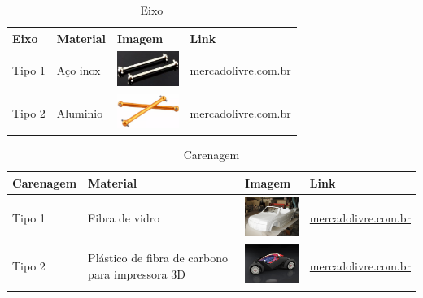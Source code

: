   \begin{table}[!htbp]
  \begin{center}
  \caption{Eixo}
  \begin{tabular}{|p{2cm}|p{3cm}|p{2cm}|p{4cm}|}
  \hline
  \textbf{Eixo} & \textbf{Material} & \textbf{Imagem} & \textbf{Link}\\\hline\hline
  Tipo 1 & Aço inox & \includegraphics[width=2cm]{figuras/eixo_inox.eps} & \href{http://produto.mercadolivre.com.br/MLB-681527051-par-de-eixo-dogbone-84-mm-06061-redcat-himoto-exceed-hsp-_JM}{mercadolivre.com.br}\\\hline
  Tipo 2 & Aluminio  & \includegraphics[width=2cm]{figuras/eixo_aluminio.eps} & \href{http://produto.mercadolivre.com.br/MLB-700430643-eixos-dogbones-em-aluminio-mastadon-spino-himoto-23608-par-_JM}{mercadolivre.com.br}\\\hline
  \end{tabular}
  \end{center}
  \end{table}

  \begin{table}[!htbp]
  \begin{center}
  \caption{Carenagem}
  \begin{tabular}{|p{3cm}|p{3cm}|p{2cm}|p{4cm}|}
  \hline
  \textbf{Carenagem} & \textbf{Material} & \textbf{Imagem} & \textbf{Link}\\\hline\hline
  Tipo 1 & Fibra de vidro & \includegraphics[width=2cm]{figuras/carenagem_fibra.eps} & \href{http://produto.mercadolivre.com.br/MLB-712761072-kit-resina-500g-manta-fibra-de-vidro-300g-10g-catalizador-_JM}{mercadolivre.com.br}\\\hline
  Tipo 2 & Plástico de fibra de carbono para impressora 3D & \includegraphics[width=2cm]{figuras/carenagem_plastico.eps} & \href{http://produto.mercadolivre.com.br/MLB-704169297-envelopamento-fibra-carbono-teto-ou-capo-1x122-_JM}{mercadolivre.com.br}\\\hline
  \end{tabular}
  \end{center}
  \end{table}

